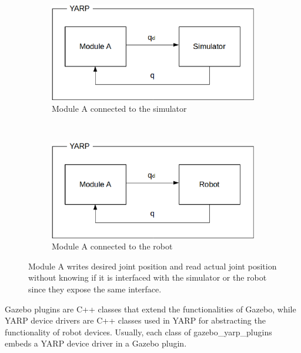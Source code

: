 \begin{figure}
        \centering
        \begin{subfigure}[b]{0.45\textwidth}
                \includegraphics[width=\textwidth]{images/yarp_simulation_a.eps}
                \caption{Module A connected to the simulator}
                \label{yarp_simulation_a}
        \end{subfigure}%
        \\
        \begin{subfigure}[b]{0.45\textwidth}
                \includegraphics[width=\textwidth]{images/yarp_simulation_b.eps}
                \caption{Module A connected to the robot}
                \label{yarp_simulation_b}
        \end{subfigure}
        \caption{Module A writes desired joint position and read actual joint position without knowing if it is interfaced with the simulator or the robot since they expose the same interface.}
        \label{yarp_simulation}
\end{figure}

Gazebo plugins are C++ classes that extend the functionalities of Gazebo, while YARP device drivers are C++ classes used in YARP for abstracting the functionality of robot devices.
Usually, each class of gazebo\_yarp\_plugins embeds a YARP device driver in a Gazebo plugin. 

